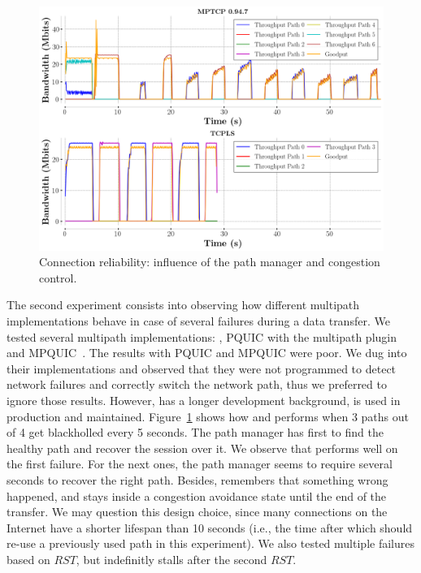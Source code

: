 \begin{figure}[!t] 
  \begin{center}
    \includegraphics[width=\columnwidth]{figures/tcpls_mptcp.png} 
  \end{center}
  \caption{Connection reliability: influence of the path manager and congestion
    control.}
  \label{fig:failover}
\end{figure}

The second experiment consists into observing how different multipath
implementations behave in case of several failures during a data transfer. We
tested several multipath implementations: \mptcp, PQUIC with the multipath
plugin~\cite{de2019pluginizing} and MPQUIC~\cite{de2017multipath}. The results with PQUIC and MPQUIC were
poor. We dug into their implementations and observed that they were not programmed
to detect network failures and correctly switch the network path, thus we
preferred to ignore those results. However, \mptcp has a longer development
background, is used in production and maintained. Figure~\ref{fig:failover}
shows how \mptcp and \tcpls performs when 3 paths out of 4 get blackholled every
5 seconds. The path manager has first to find the healthy path and recover the
session over it. We observe that \mptcp performs well on the first
failure. For the next ones, the path manager seems to require several seconds to
recover the right path. Besides, \mptcp remembers that something wrong happened,
and stays inside a congestion avoidance state until the end of the transfer. We
may question this design choice, since many \tcp connections on the Internet have
a shorter lifespan than 10 seconds (i.e., the time after which \mptcp should
re-use a previously used path in this experiment). We also tested multiple
failures based on $RST$, but \mptcp indefinitly stalls after the second $RST$.

